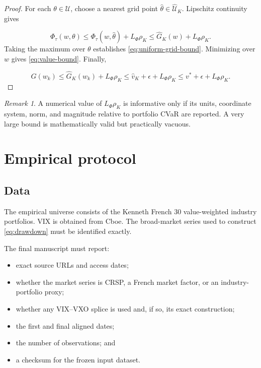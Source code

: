 \documentclass[11pt,a4paper]{article}
\theoremstyle{definition}
\theoremstyle{remark}
\newtheorem{remark}{Remark}
\newcommand{\U}{\mathcal{U}}
\newcommand{\Ugrid}{\widehat{\mathcal{U}}}
\begin{document}
\begin{proof}
For each \(\theta\in\U\), choose a nearest grid point
\(\widehat\theta\in\Ugrid_K\). Lipschitz continuity gives

\[
\Phi_\tau(w,\theta)
\le
\Phi_\tau(w,\widehat\theta)+L_\Phi\rho_K
\le
\widehat G_K(w)+L_\Phi\rho_K.
\]
Taking the maximum over \(\theta\) establishes
\eqref{eq:uniform-grid-bound}. Minimizing over \(w\) gives
\eqref{eq:value-bound}. Finally,

\[
G(w_k)
\le
\widehat G_K(w_k)+L_\Phi\rho_K
\le
\widehat v_K+\epsilon+L_\Phi\rho_K
\le
v^*+\epsilon+L_\Phi\rho_K.
\]
\end{proof}

\begin{remark}
A numerical value of \(L_\Phi\rho_K\) is informative only if its units,
coordinate system, norm, and magnitude relative to portfolio CVaR are
reported. A very large bound is mathematically valid but practically
vacuous.
\end{remark}

\section{Empirical protocol}

\subsection{Data}

The empirical universe consists of the Kenneth French 30 value-weighted
industry portfolios. VIX is obtained from Cboe. The broad-market series used
to construct \eqref{eq:drawdown} must be identified exactly.

The final manuscript must report:

\begin{itemize}
    \item exact source URLs and access dates;
    \item whether the market series is CRSP, a French market factor, or an
    industry-portfolio proxy;
    \item whether any VIX--VXO splice is used and, if so, its exact
    construction;
    \item the first and final aligned dates;
    \item the number of observations; and
    \item a checksum for the frozen input dataset.
\end{itemize}
\end{document}

